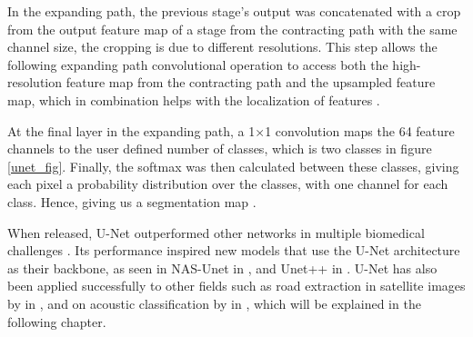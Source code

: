     In the expanding path, the previous stage's output was concatenated with a crop from the output feature map of a stage from the contracting path with the same channel size, the cropping is due to different resolutions. This step allows the following expanding path convolutional operation to access both the high-resolution feature map from the contracting path and the upsampled feature map, which in combination helps with the localization of features \cite{unet_ronneberger2015}. 

    At the final layer in the expanding path, a 1×1 convolution maps the 64 feature channels to the user defined number of classes, which is two classes in figure \ref{unet_fig}. Finally, the softmax was then calculated between these classes, giving each pixel a probability distribution over the classes, with one channel for each class. Hence, giving us a segmentation map \cite{unet_ronneberger2015}.
    
    
    
    When released, U-Net outperformed other networks in multiple biomedical challenges \cite{unet_ronneberger2015}. Its performance inspired new models that use the U-Net architecture as their backbone, as seen in NAS-Unet \cite{weng2019unet} in \citeyear{weng2019unet}, and Unet++ \cite{zhou2018unet} in \citeyear{zhou2018unet}. U-Net has also been applied successfully  to other fields such as road extraction in satellite images by \citeauthor{zhang2018road} \cite{zhang2018road} in \citeyear{zhang2018road}, and on acoustic classification by \citeauthor{brautaset2020acoustic} \cite{brautaset2020acoustic} in \citeyear{brautaset2020acoustic}, which will be explained in the following chapter.
    
    
\clearpage

